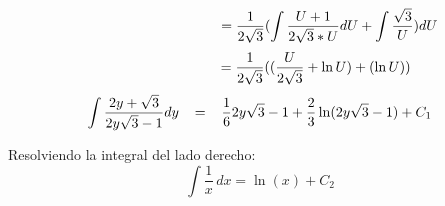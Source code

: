 \documentclass[12pt,letterpaper]{article}
\begin{document}
\begin{titlepage}
\begin{flushleft}
\begin{equation*} 
 \hspace{3.5cm}= \frac{1}{2 \sqrt{3}}( \int\frac{U + 1}{2 \sqrt{3}*U} dU + \int\frac{\sqrt{3}}{U}) dU
\end{equation*}
\begin{equation*} 
 \hspace{2.8cm}= \frac{1}{2 \sqrt{3}}((\frac{U}{2 \sqrt{3}} + \ln U ) + ( \ln U))
\end{equation*}
\begin{equation*} 
\int \frac{2y + \sqrt{3}}{2y \sqrt{3} - 1}dy \hspace{0.3 cm} = \hspace{0.3 cm} \frac{1}{6} 2y \sqrt{3} -1 + \frac{2}{3} \ln (2y \sqrt{3} - 1) + C_{1}
\end{equation*}

Resolviendo la integral del lado derecho:
\begin{equation*} 
\int \frac{1}{x} \,dx = \ln(x) + C_{2}
\end{equation*}

\end{flushleft}
\end{titlepage}
\end{document}
